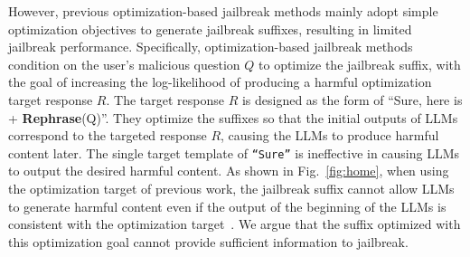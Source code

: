 \par However, previous optimization-based jailbreak methods mainly adopt simple optimization objectives to generate jailbreak suffixes, resulting in limited jailbreak performance. Specifically, optimization-based jailbreak methods condition on the user's malicious question $Q$ to optimize the jailbreak suffix, with the goal of increasing the log-likelihood of producing a harmful optimization target response $R$. The target response $R$ is designed as the form of ``Sure, here is + \textbf{Rephrase}(Q)''. 
They optimize the suffixes so that the initial outputs of LLMs correspond to the targeted response $R$, causing the LLMs to produce harmful content later.
The single target template of \texttt{``Sure''} is ineffective in causing LLMs to output the desired harmful content. As shown in Fig.~\ref{fig:home}, when using the optimization target of previous work, the jailbreak suffix cannot allow LLMs to generate harmful content even if the output of the beginning of the LLMs is consistent with the optimization target~\cite{wang2024closer,chu2024comprehensive}. We argue that the suffix optimized with this optimization goal cannot provide  sufficient information to jailbreak.

